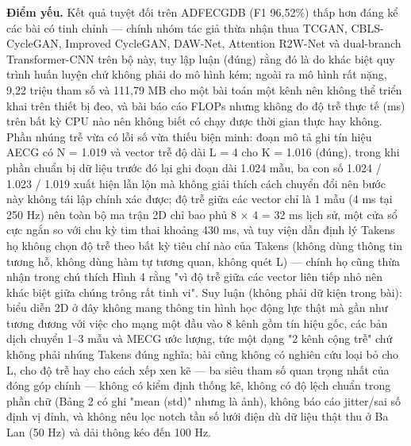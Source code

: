 \documentclass[12pt,a4paper]{article}
\begin{document}
\noindent \textbf{Điểm yếu.} Kết quả tuyệt đối trên ADFECGDB (F1 96,52\%) thấp hơn đáng kể các bài có tinh chỉnh — chính nhóm tác giả thừa nhận thua TCGAN, CBLS-CycleGAN, Improved CycleGAN, DAW-Net, Attention R2W-Net và dual-branch Transformer-CNN trên bộ này, tuy lập luận (đúng) rằng đó là do khác biệt quy trình huấn luyện chứ không phải do mô hình kém; ngoài ra mô hình rất nặng, 9,22 triệu tham số và 111,79 MB cho một bài toán một kênh nên không thể triển khai trên thiết bị đeo, và bài báo cáo FLOPs nhưng không đo độ trễ thực tế (ms) trên bất kỳ CPU nào nên không biết có chạy được thời gian thực hay không. Phần nhúng trễ vừa có lỗi số vừa thiếu biện minh: đoạn mô tả ghi tín hiệu AECG có N = 1.019 và vector trễ độ dài L = 4 cho K = 1.016 (đúng), trong khi phần chuẩn bị dữ liệu trước đó lại ghi đoạn dài 1.024 mẫu, ba con số 1.024 / 1.023 / 1.019 xuất hiện lẫn lộn mà không giải thích cách chuyển đổi nên bước này không tái lập chính xác được; độ trễ giữa các vector chỉ là 1 mẫu (4 ms tại 250 Hz) nên toàn bộ ma trận 2D chỉ bao phủ 8 × 4 = 32 ms lịch sử, một cửa sổ cực ngắn so với chu kỳ tim thai khoảng 430 ms, và tuy viện dẫn định lý Takens họ không chọn độ trễ theo bất kỳ tiêu chí nào của Takens (không dùng thông tin tương hỗ, không dùng hàm tự tương quan, không quét L) — chính họ cũng thừa nhận trong chú thích Hình 4 rằng "vì độ trễ giữa các vector liên tiếp nhỏ nên khác biệt giữa chúng trông rất tinh vi". Suy luận (không phải dữ kiện trong bài): biểu diễn 2D ở đây không mang thông tin hình học động lực thật mà gần như tương đương với việc cho mạng một đầu vào 8 kênh gồm tín hiệu gốc, các bản dịch chuyển 1–3 mẫu và MECG ước lượng, tức một dạng "2 kênh cộng trễ" chứ không phải nhúng Takens đúng nghĩa; bài cũng không có nghiên cứu loại bỏ cho L, cho độ trễ hay cho cách xếp xen kẽ — ba siêu tham số quan trọng nhất của đóng góp chính — không có kiểm định thống kê, không có độ lệch chuẩn trong phần chữ (Bảng 2 có ghi "mean (std)" nhưng là ảnh), không báo cáo jitter/sai số định vị đỉnh, và không nêu lọc notch tần số lưới điện dù dữ liệu thật thu ở Ba Lan (50 Hz) và dải thông kéo đến 100 Hz.\par\vspace{3pt}
\end{document}
